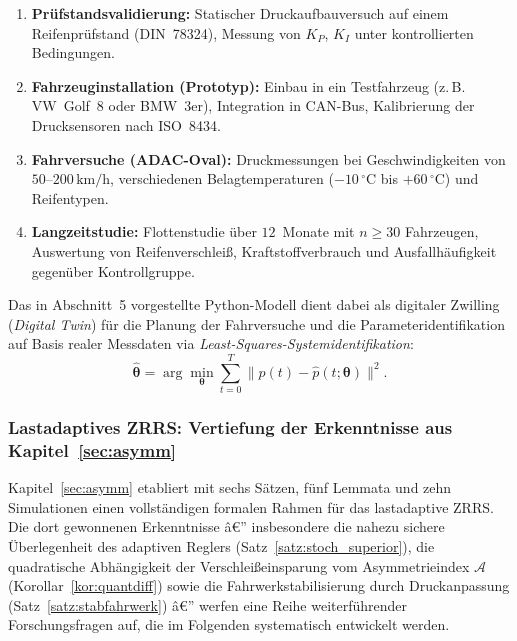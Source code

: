 ﻿\documentclass[a4paper,12pt]{article}
\theoremstyle{definition}
\begin{document}
\begin{enumerate}
    \item \textbf{Prüfstandsvalidierung:} Statischer Druckaufbauversuch
    auf einem Reifenprüfstand (DIN~78324), Messung von $K_P$, $K_I$ unter
    kontrollierten Bedingungen.
    \item \textbf{Fahrzeuginstallation (Prototyp):} Einbau in ein Testfahrzeug
    (z.\,B. VW~Golf~8 oder BMW~3er), Integration in CAN-Bus, Kalibrierung
    der Drucksensoren nach ISO~8434.
    \item \textbf{Fahrversuche (ADAC-Oval):} Druckmessungen bei Geschwindigkeiten
    von $50$--$200\,\text{km/h}$, verschiedenen Belagtemperaturen
    ($-10\,^\circ\mathrm{C}$ bis $+60\,^\circ\mathrm{C}$) und Reifentypen.
    \item \textbf{Langzeitstudie:} Flottenstudie über $12$~Monate mit
    $n \geq 30$ Fahrzeugen, Auswertung von Reifenverschleiß, Kraftstoff\-verbrauch
    und Ausfallhäufigkeit gegenüber Kontrollgruppe.
\end{enumerate}

Das in Abschnitt~5 vorgestellte Python-Modell dient dabei als digitaler Zwilling
(\emph{Digital Twin}) für die Planung der Fahrversuche und die
Parameteridentifikation auf Basis realer Messdaten via
\emph{Least-Squares-Systemidentifikation}:
\[
    \hat{\boldsymbol{\theta}} = \arg\min_{\boldsymbol{\theta}}
    \sum_{t=0}^{T} \bigl\|p(t) - \hat{p}(t; \boldsymbol{\theta})\bigr\|^2.
\]

\subsubsection{Lastadaptives ZRRS: Vertiefung der Erkenntnisse aus Kapitel~\ref{sec:asymm}}
\label{sec:ausblick_asymm}

Kapitel~\ref{sec:asymm} etabliert mit sechs Sätzen, fünf Lemmata und zehn
Simulationen einen vollständigen formalen Rahmen für das lastadaptive ZRRS.
Die dort gewonnenen Erkenntnisse â€” insbesondere die nahezu sichere Überlegenheit
des adaptiven Reglers (Satz~\ref{satz:stoch_superior}), die quadratische
Abhängigkeit der Verschleißeinsparung vom Asymmetrieindex $\mathcal{A}$
(Korollar~\ref{kor:quantdiff}) sowie die Fahrwerkstabilisierung durch
Druckanpassung (Satz~\ref{satz:stabfahrwerk}) â€” werfen eine Reihe weiterführender
Forschungsfragen auf, die im Folgenden systematisch entwickelt werden.
\end{document}
